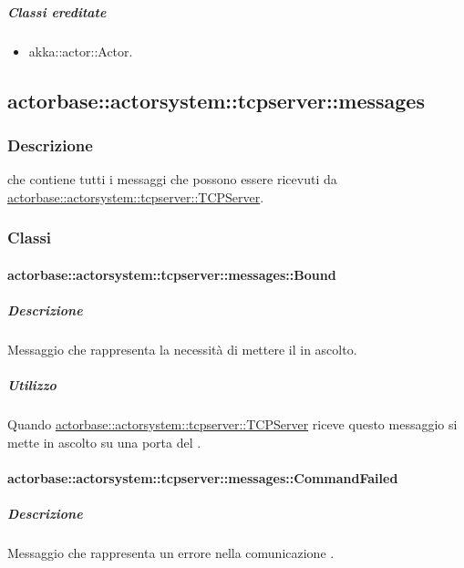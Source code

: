 \documentclass{scalatekids-article}
\begin{document}
\subparagraph{Classi ereditate}

\begin{itemize}

\item akka::actor::Actor.

\end{itemize}

\subsection{actorbase::actorsystem::tcpserver::messages}
\label{sec:actorbase::actorsystem::tcpserver::messages}

\subsubsection{Descrizione}

 che contiene tutti i messaggi che possono essere ricevuti da
\hyperref[sec:actorbase::actorsystem::tcpserver::TCPServer]{actorbase::actorsystem::tcpserver::TCPServer}.

\subsubsection{Classi}

\paragraph{actorbase::actorsystem::tcpserver::messages::Bound}
\label{sec:actorbase::actorsystem::tcpserver::messages::Bound}

\subparagraph{Descrizione}

Messaggio che rappresenta la necessità di mettere il  in ascolto.

\subparagraph{Utilizzo}

Quando \hyperref[sec:actorbase::actorsystem::tcpserver::TCPServer]{actorbase::actorsystem::tcpserver::TCPServer}
riceve questo messaggio si mette in ascolto su una porta del .

\paragraph{actorbase::actorsystem::tcpserver::messages::CommandFailed}
\label{sec:actorbase::actorsystem::tcpserver::messages::CommandFailed}

\subparagraph{Descrizione}

Messaggio che rappresenta un errore nella comunicazione .
\end{document}

